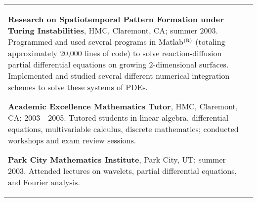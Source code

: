 \documentclass{article}
\begin{document}
\begin{center}
\begin{tabular}{@{}p{\CWa\columnwidth}@{}p{\CWb\columnwidth}@{}}
\begin{minipage}[t]{\CWb\columnwidth}
\vspace{\VSEX}
\par \textbf{Research on Spatiotemporal Pattern Formation under Turing Instabilities}, HMC, Claremont, CA; summer 2003. Programmed and used several programs in Matlab$^{\rm (R)}$ (totaling approximately 20,000 lines of code) to solve reaction-diffusion partial differential equations on growing 2-dimensional surfaces. Implemented and studied several different numerical integration schemes to solve these systems of PDEs.
\vspace{\VSEX}
\par \textbf{Academic Excellence Mathematics Tutor}, HMC, Claremont, CA; 2003 - 2005. Tutored students in linear algebra, differential equations, multivariable calculus, discrete mathematics; conducted workshops and exam review sessions.
\par \textbf{Park City Mathematics Institute}, Park City, UT; summer 2003. Attended lectures on wavelets, partial differential equations, and Fourier analysis.
\end{minipage}
\end{tabular}

\vspace{\VS}


\end{center}
\end{document}
